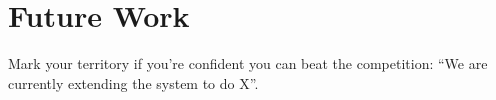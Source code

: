 \section{Future Work}\label{sec:future}
Mark your territory if you're confident you can beat the competition: ``We are
currently extending the system to do X''.